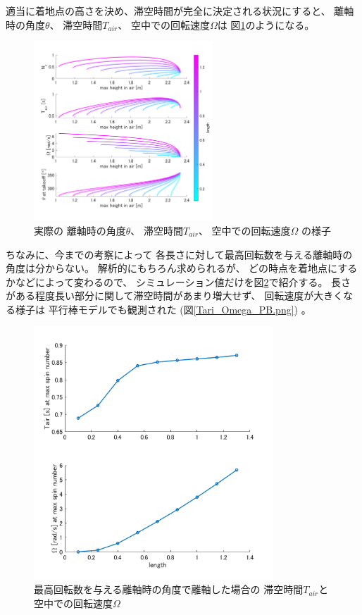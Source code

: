 \documentclass[a4paper,11pt]{jsarticle}
\begin{document}
適当に着地点の高さを決め、滞空時間が完全に決定される状況にすると、
離軸時の角度$\theta$、
滞空時間$T_{air}$、
空中での回転速度$\Omega$は
図\ref{result.png}のようになる。
\begin{figure}[h]
  \centering
  \includegraphics[width = 0.6\textwidth]{result.png}
  \caption{
    実際の
    離軸時の角度$\theta$、
    滞空時間$T_{air}$、
    空中での回転速度$\Omega$
    の様子
    }
  \label{result.png}
\end{figure}

ちなみに、今までの考察によって
各長さに対して最高回転数を与える離軸時の角度は分からない。
解析的にもちろん求められるが、
どの時点を着地点にするかなどによって変わるので、
シミュレーション値だけを図\ref{Tair_Omega_at_maxspin.png}で紹介する。
長さがある程度長い部分に関して滞空時間があまり増大せず、
回転速度が大きくなる様子は
平行棒モデルでも観測された
(図\ref{Tari_Omega_PB.png})
。

\begin{figure}[h]
  \centering
  \includegraphics[width = 0.8\textwidth]{Tair_Omega_at_maxspin.png}
  \caption{
    最高回転数を与える離軸時の角度で離軸した場合の
    滞空時間$T_{air}$と
    空中での回転速度$\Omega$
  }
  \label{Tair_Omega_at_maxspin.png}
\end{figure}
\end{document}
